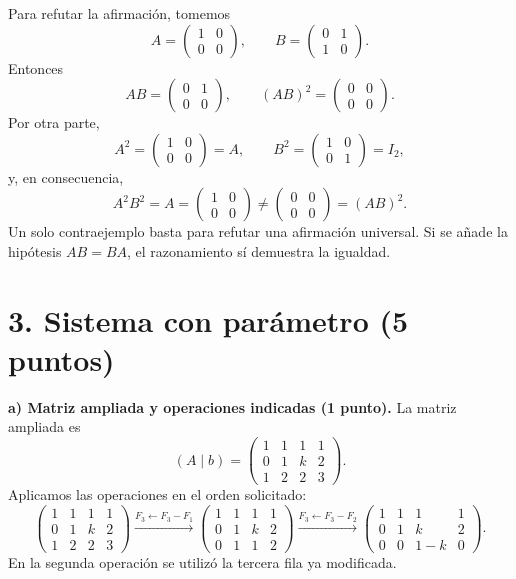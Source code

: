 \documentclass[10pt,a4]{examenEPN0}
\begin{document}
Para refutar la afirmación, tomemos
\[
    A=\begin{pmatrix}1&0\\0&0\end{pmatrix},\qquad
    B=\begin{pmatrix}0&1\\1&0\end{pmatrix}.
\]
Entonces
\[
    AB=\begin{pmatrix}0&1\\0&0\end{pmatrix},\qquad
    (AB)^2=\begin{pmatrix}0&0\\0&0\end{pmatrix}.
\]
Por otra parte,
\[
    A^2=\begin{pmatrix}1&0\\0&0\end{pmatrix}=A,\qquad
    B^2=\begin{pmatrix}1&0\\0&1\end{pmatrix}=I_2,
\]
y, en consecuencia,
\[
    A^2B^2=A=\begin{pmatrix}1&0\\0&0\end{pmatrix}
    \ne\begin{pmatrix}0&0\\0&0\end{pmatrix}=(AB)^2.
\]
Un solo contraejemplo basta para refutar una afirmación universal.
Si se añade la hipótesis $AB=BA$, el razonamiento sí demuestra la igualdad.

\newpage
\section*{3. Sistema con parámetro (5 puntos)}
\noindent\textbf{a) Matriz ampliada y operaciones indicadas (1 punto).}
La matriz ampliada es
\[
    (A\mid b)=\left(\begin{array}{ccc|c}
        1&1&1&1\\0&1&k&2\\1&2&2&3
    \end{array}\right).
\]
Aplicamos las operaciones en el orden solicitado:
\[
    \left(\begin{array}{ccc|c}
        1&1&1&1\\0&1&k&2\\1&2&2&3
    \end{array}\right)
    \xrightarrow{F_3\leftarrow F_3-F_1}
    \left(\begin{array}{ccc|c}
        1&1&1&1\\0&1&k&2\\0&1&1&2
    \end{array}\right)
    \xrightarrow{F_3\leftarrow F_3-F_2}
    \left(\begin{array}{ccc|c}
        1&1&1&1\\0&1&k&2\\0&0&1-k&0
    \end{array}\right).
\]
En la segunda operación se utilizó la tercera fila ya modificada.
\end{document}
